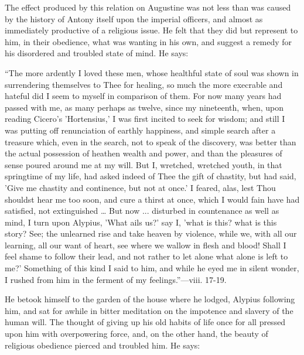 The effect produced by this relation on Augustine was not less than
was caused by the history of Antony itself upon the imperial officers,
and almost as immediately productive of a religious issue. He felt
that they did but represent to him, in their obedience, what was
wanting in his own, and suggest a remedy for his disordered and
troubled state of mind. He says:

``The more ardently I loved these men, whose healthful state of
soul was shown in surrendering themselves to Thee for healing, so much
the more execrable and hateful did I seem to myself in comparison of
them. For now many years had passed with me, as many perhaps as
twelve, since my nineteenth, when, upon reading Cicero's 'Hortensius,'
I was first incited to seek for wisdom; and still I was putting off
renunciation of earthly happiness, and simple search after a treasure
which, even in the search, not to speak of the discovery, was better
than the actual possession of heathen wealth and power, and than the
pleasures of sense poured around me at my will. But I, wretched,
wretched youth, in that springtime of my life, had asked indeed of
Thee the gift of chastity, but had said, 'Give me chastity and
continence, but not at once.' I feared, alas, lest Thou shouldst hear
me too soon, and cure a thirst at once, which I would fain have had
satisfied, not extinguished … But now ... disturbed in countenance
as well as mind, I turn upon Alypius, 'What ails us?' say I, 'what is
this? what is this story? See; the unlearned rise and take heaven by
violence, while we, with all our learning, all our want of heart, see
where we wallow in flesh and blood! Shall I feel shame to follow their
lead, and not rather to let alone what alone is left to me?' Something
of this kind I said to him, and while he eyed me in silent wonder, I
rushed from him in the ferment of my feelings.''—viii. 17-19.

He betook himself to the garden of the house where he lodged,
Alypius following him, and sat for awhile in bitter meditation on the
impotence and slavery of the human will. The thought of giving
up his old habits of life once for all pressed upon him with
overpowering force, and, on the other hand, the beauty of religious
obedience pierced and troubled him. He says:

